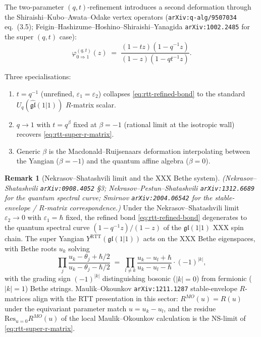 \documentclass[11pt]{amsart}
\theoremstyle{definition}
\newtheorem{remark}[theorem]{Remark}
\providecommand{\fgl}{\mathfrak{gl}}
\begin{document}
The two-parameter $(q, t)$-refinement introduces a second deformation
through the Shiraishi--Kubo--Awata--Odake vertex operators
(\texttt{arXiv:q-alg/9507034} eq.~(3.5);
Feigin--Hashizume--Hoshino--Shiraishi--Yanagida
\texttt{arXiv:1002.2485} for the super $(q, t)$ case):
\begin{equation}\label{eq:rtt-refined-bond}
  \varphi^{(q, t)}_{0 \Rightarrow 1}(z)
  \;=\;
  \frac{(1 - t z)(1 - q^{-1} z)}
       {(1 - z)(1 - q t^{-1} z)}.
\end{equation}

Three specialisations:
\begin{enumerate}[leftmargin=2em]
\item $t = q^{-1}$ (unrefined, $\varepsilon_1 = \varepsilon_2$) collapses
  \eqref{eq:rtt-refined-bond} to the standard
  $U_q(\widehat{\fgl}(1|1))$ $R$-matrix scalar.
\item $q \to 1$ with $t = q^\beta$ fixed at $\beta = -1$ (rational limit
  at the isotropic wall) recovers \eqref{eq:rtt-super-r-matrix}.
\item Generic $\beta$ is the Macdonald--Ruijsenaars deformation
  interpolating between the Yangian ($\beta = -1$) and the quantum
  affine algebra ($\beta = 0$).
\end{enumerate}

\begin{remark}[Nekrasov--Shatashvili limit and the XXX Bethe system]
\label{rem:NS-limit}
\emph{(Nekrasov--Shatashvili
\texttt{arXiv:0908.4052} \S3; Nekrasov--Pestun--Shatashvili
\texttt{arXiv:1312.6689} for the quantum spectral curve;
Smirnov \texttt{arXiv:2004.06542} for the stable-envelope / $R$-matrix
correspondence.)}
Under the Nekrasov--Shatashvili limit $\varepsilon_2 \to 0$ with
$\varepsilon_1 = \hbar$ fixed, the refined bond
\eqref{eq:rtt-refined-bond} degenerates to the quantum spectral curve
$(1 - q^{-1} z)/(1 - z)$ of the $\fgl(1|1)$ XXX spin chain. The super
Yangian $Y^{\mathrm{RTT}}(\fgl(1|1))$ acts on the XXX Bethe
eigenspaces, with Bethe roots $u_k$ solving
\[
  \prod_j \frac{u_k - \theta_j + \hbar/2}{u_k - \theta_j - \hbar/2}
  \;=\;
  \prod_{l \neq k} \frac{u_k - u_l + \hbar}{u_k - u_l - \hbar}\cdot
  (-1)^{|k|},
\]
with the grading sign $(-1)^{|k|}$ distinguishing bosonic ($|k| = 0$)
from fermionic ($|k| = 1$) Bethe strings. Maulik--Okounkov
\texttt{arXiv:1211.1287} stable-envelope $R$-matrices align with the
RTT presentation in this sector: $R^{MO}(u) = R(u)$ under the
equivariant parameter match $u = u_k - u_l$, and the residue
$\mathrm{Res}_{u = 0} R^{MO}(u)$ of the local Maulik--Okounkov
calculation is the NS-limit of \eqref{eq:rtt-super-r-matrix}.
\end{remark}
\end{document}
